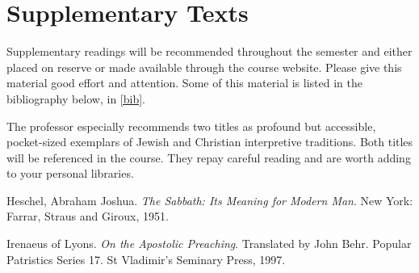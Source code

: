 \documentclass[titlepage]{article}
\begin{document}
\section{Supplementary Texts}
\label{supplementary}

Supplementary readings will be recommended throughout the semester and
either placed on reserve or made available through the course website.
Please give this material good effort and attention. Some of this
material is listed in the bibliography below, in \autoref{bib}.


The professor especially recommends two titles as profound but
accessible, pocket-sized exemplars of Jewish and Christian interpretive
traditions. Both titles will be referenced in the course. They repay
careful reading and are worth adding to your personal libraries.


\begingroup
\renewcommand{\section}[2]{}%
\begin{thebibliography}{Irenaeus}%

	 Heschel, Abraham Joshua.
	\emph{The Sabbath: Its Meaning for Modern Man}.
	New York: Farrar, Straus and Giroux, 1951.

	 Irenaeus of Lyons.
	\emph{On the Apostolic Preaching}. Translated by John Behr. Popular Patristics Series 17.
	St Vladimir’s Seminary Press, 1997.


\end{thebibliography}
\endgroup
\end{document}
